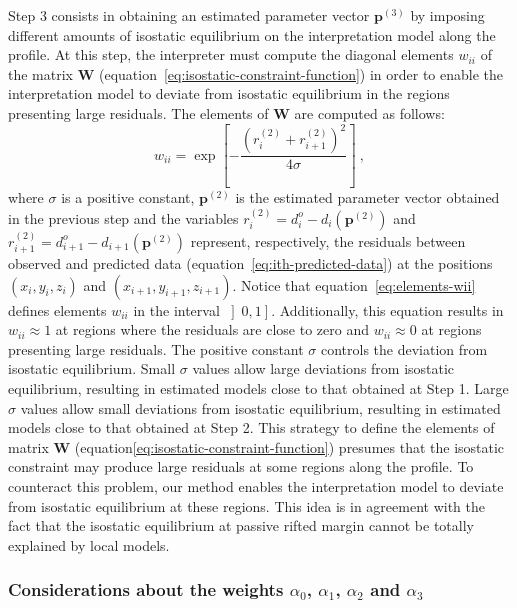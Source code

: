\documentclass[manuscript]{geophysics}
\begin{document}
Step 3 consists in obtaining an estimated parameter vector $\mathbf{p}^{(3)}$
by imposing different amounts of isostatic equilibrium on the interpretation model along the
profile. At this step, the interpreter must compute the diagonal elements 
$w_{ii}$ of the matrix $\mathbf{W}$ (equation~\ref{eq:isostatic-constraint-function}) 
in order to enable the interpretation model to deviate from isostatic equilibrium in 
the regions presenting large residuals. 
The elements of $\mathbf{W}$ are computed as follows:
\begin{equation} \label{eq:elements-wii}
w_{ii} = 
\exp \left[ - \frac{ \left( r_{i}^{(2)} + r_{i+1}^{(2)} \right)^{2}}{4 \sigma} \right] \: ,
\end{equation}
where $\sigma$ is a positive constant, $\mathbf{p}^{(2)}$ is the estimated parameter vector
obtained in the previous step and the variables
$r_{i}^{(2)} = d^{o}_{i} - d_{i} \left( \mathbf{p}^{(2)} \right)$ and 
$r_{i+1}^{(2)} = d^{o}_{i+1} - d_{i+1} \left(\mathbf{p}^{(2)} \right)$ represent,
respectively, the residuals between observed and predicted data
(equation~\ref{eq:ith-predicted-data}) at the positions $(x_{i}, y_{i}, z_{i})$ and 
$(x_{i+1}, y_{i+1}, z_{i+1})$. Notice that equation~\ref{eq:elements-wii} defines elements 
$w_{ii}$ in the interval $\left] 0, 1 \right]$. Additionally, this equation results in 
$w_{ii} \approx 1$ at regions where the residuals are close to zero and 
$w_{ii} \approx 0$ at regions presenting large residuals.
The positive constant $\sigma$ controls the deviation from isostatic equilibrium.
Small $\sigma$ values allow large deviations from isostatic equilibrium,
resulting in estimated models close to that obtained at Step 1.
Large $\sigma$ values allow small deviations from isostatic equilibrium,
resulting in estimated models close to that obtained at Step 2.
This strategy to define the elements of matrix $\mathbf{W}$ 
(equation\ref{eq:isostatic-constraint-function}) presumes that the isostatic constraint may
produce large residuals at some regions along the profile. To counteract this problem,
our method enables the interpretation model to deviate from isostatic equilibrium at these 
regions. This idea is in agreement with the fact that the isostatic equilibrium at 
passive rifted margin cannot be totally explained by local models.

\subsubsection{Considerations about the weights $\alpha_{0}$, $\alpha_{1}$, $\alpha_{2}$ and $\alpha_{3}$}
\end{document}
